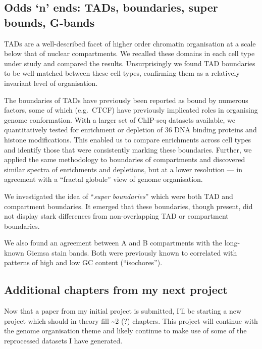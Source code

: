 \documentclass[a4paper,10pt,oneside]{book}
\begin{document}
\subsection{\textbf{Odds `n' ends}: TADs, boundaries, super bounds,
G-bands}\label{odds-n-ends-tads-boundaries-super-bounds-g-bands}

TADs are a well-described facet of higher order chromatin organisation
at a scale below that of nuclear compartments. We recalled these domains
in each cell type under study and compared the results. Unsurprisingly
we found TAD boundaries to be well-matched between these cell types,
confirming them as a relatively invariant level of organisation.

The boundaries of TADs have previously been reported as bound by
numerous factors, some of which (e.g.~CTCF) have previously implicated
roles in organising genome conformation. With a larger set of ChIP-seq
datasets available, we quantitatively tested for enrichment or depletion
of 36 DNA binding proteins and histone modifications. This enabled us to
compare enrichments across cell types and identify those that were
consistently marking these boundaries. Further, we applied the same
methodology to boundaries of compartments and discovered similar spectra
of enrichments and depletions, but at a lower resolution --- in
agreement with a ``fractal globule'' view of genome organisation.

We investigated the idea of ``\emph{super boundaries}'' which were both
TAD and compartment boundaries. It emerged that these boundaries, though
present, did not display stark differences from non-overlapping TAD or
compartment boundaries.

We also found an agreement between A and B compartments with the
long-known Giemsa stain bands. Both were previously known to correlated
with patterns of high and low GC content (``isochores'').

\subsection{Additional chapters from my next
project}\label{additional-chapters-from-my-next-project}

Now that a paper from my initial project is submitted, I'll be starting
a new project which should in theory fill \textasciitilde{}2 (?)
chapters. This project will continue with the genome organisation theme
and likely continue to make use of some of the reprocessed datasets I
have generated.
\end{document}
